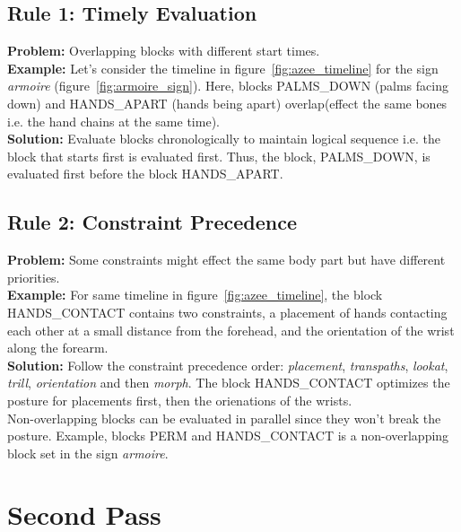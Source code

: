 \documentclass[../../main.tex]{subfiles}
\begin{document}
\subsection{Rule 1: Timely Evaluation}
\label{ch:multi_track:resolve_conflitcs:rule1}

\textbf{Problem:} Overlapping blocks with different start times. \\

\textbf{Example:} Let's consider the timeline in figure~\ref{fig:azee_timeline} for the sign \emph{armoire} (figure~\ref{fig:armoire_sign}). Here, blocks PALMS\_DOWN (palms facing down) and HANDS\_APART (hands being apart) overlap(effect the same bones i.e. the hand chains at the same time).  \\

\textbf{Solution:} Evaluate blocks chronologically to maintain logical sequence i.e. the block that starts first is evaluated first. Thus, the block, PALMS\_DOWN, is evaluated first before the block HANDS\_APART.  \\

\subsection{Rule 2: Constraint Precedence}
\label{ch:multi_track:resolve_conflitcs:rule2}

\textbf{Problem:} Some constraints might effect the same body part but have different priorities. \\

\textbf{Example:} For same timeline in figure~\ref{fig:azee_timeline}, the block HANDS\_CONTACT contains two constraints, a placement of hands contacting each other at a small distance from the forehead, and the orientation of the wrist along the forearm. \\

\textbf{Solution:} Follow the constraint precedence order: \emph{placement}, \emph{transpaths}, \emph{lookat}, \emph{trill}, \emph{orientation} and then \emph{morph}. The block HANDS\_CONTACT optimizes the posture for placements first, then the orienations of the wrists. \\

Non-overlapping blocks can be evaluated in parallel since they won't break the posture. Example, blocks PERM and HANDS\_CONTACT is a non-overlapping block set in the sign \emph{armoire}.

\section{Second Pass}
\label{ch:multi_track:second_pass}
\end{document}
